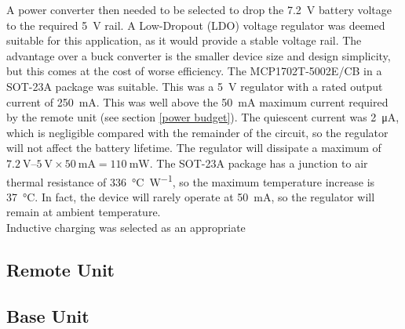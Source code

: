 A power converter then needed to be selected to drop the \SI{7.2}{\volt} battery voltage to the required \SI{5}{\volt} rail. A Low-Dropout (LDO) voltage regulator was deemed suitable for this application, as it would provide a stable voltage rail. The advantage over a buck converter is the smaller device size and design simplicity, but this comes at the cost of worse efficiency. The MCP1702T-5002E/CB \cite{mcp1702} in a SOT-23A package was suitable. This was a \SI{5}{\volt} regulator with a rated output current of \SI{250}{\milli\ampere}. This was well above the \SI{50}{\milli\ampere} maximum current required by the remote unit (see section \ref{power budget}). The quiescent current was \SI{2}{\micro\ampere}, which is negligible compared with the remainder of the circuit, so the regulator will not affect the battery lifetime. The regulator will dissipate a maximum of $\SIrange{7.2}{5}{\volt}\times\SI{50}{\milli\ampere}=\SI{110}{\milli\watt}$. The SOT-23A package has a junction to air thermal resistance of \SI{336}{\celsius\per\watt}, so the maximum temperature increase is \SI{37}{\celsius}. In fact, the device will rarely operate at \SI{50}{\milli\ampere}, so the regulator will remain at ambient temperature.\\




Inductive charging was selected as an appropriate 


\subsection{Remote Unit}

\subsection{Base Unit}
